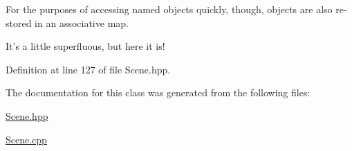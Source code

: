 For the purposes of accessing named objects quickly, though, objects are also re-\/stored in an associative map. 

It's a little superfluous, but here it is! 

Definition at line 127 of file Scene.\-hpp.



The documentation for this class was generated from the following files\-:\begin{DoxyCompactItemize}
\item 
\hyperlink{_scene_8hpp}{Scene.\-hpp}\item 
\hyperlink{_scene_8cpp}{Scene.\-cpp}\end{DoxyCompactItemize}
